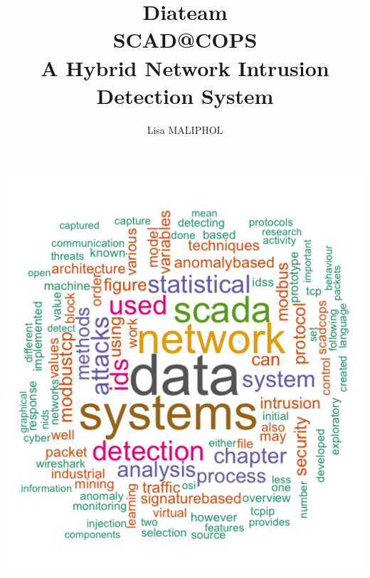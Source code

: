 \documentclass[12pt,]{article}
\title{Diateam\\SCAD@COPS\\A Hybrid Network Intrusion Detection System}
\author{Lisa MALIPHOL}
\date{}
\begin{document}
\maketitle


\includegraphics{thesis_files/figure-latex/unnamed-chunk-3-1.pdf}

\thispagestyle{empty}

\newpage
\thispagestyle{empty} \mbox{}

\clearpage
{}
\end{document}
